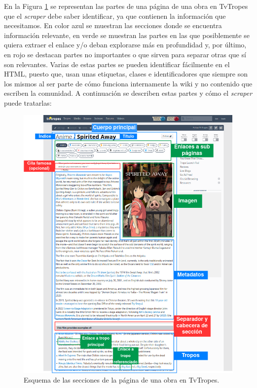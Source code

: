 En la Figura \ref{fig:tvtropes-work} se representan las partes de una página de
una obra en TvTropes que el \textit{scraper} debe saber identificar, ya que
contienen la información que necesitamos. En color azul se muestran las
secciones donde se encuentra información relevante, en verde se muestran las
partes en las que posiblemente se quiera extraer el enlace y/o deban explorarse
más en profundidad y, por último, en rojo se destacan partes no importantes o
que sirven para separar otras que sí son relevantes. Varias de estas partes se
pueden identificar fácilmente en el HTML, puesto que, usan unas etiquetas,
clases e identificadores que siempre son los mismos al ser parte de cómo
funciona internamente la wiki y no contenido que escriben la comunidad. A
continuación se describen estas partes y cómo el \textit{scraper} puede
tratarlas:

\begin{figure}[!h]
  \centering
  \includegraphics[width=\textwidth]{img/esquema-obra.png}
  \caption{Esquema de las secciones de la página de una obra en TvTropes.}
  \label{fig:tvtropes-work}
\end{figure}


